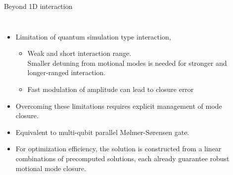 \documentclass[final]{beamer}
\newlength{\sepwid}
\newlength{\colthreewid}
\begin{document}
\begin{frame}[t]
\begin{columns}[t]
    \begin{column}{\sepwid}
      \begin{center}
        {\color{gray}\rule{3pt}{\textheight}}
      \end{center}
    \end{column} %

    \begin{column}{\colthreewid} %
      \begin{block}{Beyond 1D interaction}
        \begin{center}
          \begin{columns}
            \column{30cm}
            \begin{itemize}
            \item Limitation of quantum simulation type interaction,
              \begin{itemize}
              \item Weak and short interaction range.\\
                Smaller detuning from motional modes
                is needed for stronger and longer-ranged interaction.
              \item Fast modulation of amplitude can lead to closure error
              \end{itemize}
            \item Overcoming these limitations requires
              explicit management of mode closure.
            \item Equivalent to multi-qubit parallel M{\o}lmer-S{\o}rensen gate.
            \item For optimization efficiency, the solution is constructed from
              a linear combinations of precomputed solutions,
              each already guarantee robust motional mode closure.
            \end{itemize}
          \end{columns}
          \vspace{0.5cm}
\end{center}
\end{block}
\end{column}
\end{columns}
\end{frame}
\end{document}
